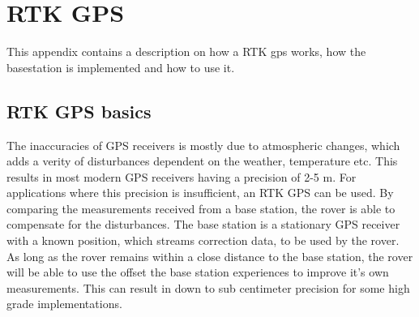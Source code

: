 \chapter{RTK GPS}\label{app:rtk_gps}
This appendix contains a description on how a RTK gps works, how the basestation is implemented and how to use it.


\section{RTK GPS basics}
The inaccuracies of GPS receivers is mostly due to atmospheric changes, which adds a verity of disturbances dependent on the weather, temperature etc.
This results in most modern GPS receivers having a precision of 2-5 m. 
For applications where this precision is insufficient, an RTK GPS can be used. 
By comparing the measurements received from a base station, the rover is able to compensate for the disturbances.
The base station is a stationary GPS receiver with a known position, which streams correction data, to be used by the rover. 
As long as the rover remains within a close distance to the base station, the rover will be able to use the offset the base station experiences to improve it's own measurements.
This can result in down to sub centimeter precision for some high grade implementations.

